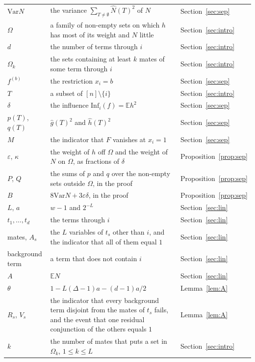 \documentclass[11pt]{amsart}
\theoremstyle{remark}
\newcommand{\Inf}{\mathrm{Inf}}
\newcommand{\Var}{\mathrm{Var}}
\newcommand{\E}{\mathbb{E}}
\begin{document}
\begin{longtable}{@{}>{\raggedright\arraybackslash}p{}>{\raggedright\arraybackslash}p{}>{\raggedright\arraybackslash}p{}@{}}
$\Var N$ & the variance $\sum_{T\ne\emptyset}\hat N(T)^2$ of $N$ & Section~\ref{sec:sep} \\
$\Omega$ & a family of non-empty sets on which $h$ has most of its weight and $N$ little & Section~\ref{sec:intro} \\
$d$ & the number of terms through $i$ & Section~\ref{sec:intro} \\
$\Omega_k$ & the sets containing at least $k$ mates of some term through $i$ & Section~\ref{sec:intro} \\
$f^{(b)}$ & the restriction $x_i=b$ & Section~\ref{sec:sep} \\
$T$ & a subset of $[n]\setminus\{i\}$ & Section~\ref{sec:intro} \\
$\delta$ & the influence $\Inf_i(f)=\E h^2$ & Section~\ref{sec:sep} \\
$p(T)$, $q(T)$ & $\hat g(T)^2$ and $\hat h(T)^2$ & Section~\ref{sec:sep} \\
$M$ & the indicator that $F$ vanishes at $x_i=1$ & Section~\ref{sec:sep} \\
$\varepsilon$, $\kappa$ & the weight of $h$ off $\Omega$ and the weight of $N$ on $\Omega$, as fractions of $\delta$ & Proposition~\ref{prop:sep} \\
$P$, $Q$ & the sums of $p$ and $q$ over the non-empty sets outside $\Omega$, in the proof & Proposition~\ref{prop:sep} \\
$B$ & $8\Var N+3\varepsilon\delta$, in the proof & Proposition~\ref{prop:sep} \\
$L$, $a$ & $w-1$ and $2^{-L}$ & Section~\ref{sec:lin} \\
$t_1,\dots,t_d$ & the terms through $i$ & Section~\ref{sec:lin} \\
mates, $A_s$ & the $L$ variables of $t_s$ other than $i$, and the indicator that all of them equal $1$ & Section~\ref{sec:lin} \\
background term & a term that does not contain $i$ & Section~\ref{sec:lin} \\
$A$ & $\E N$ & Section~\ref{sec:lin} \\
$\theta$ & $1-L(\Delta-1)a-(d-1)a/2$ & Lemma~\ref{lem:A} \\
$R_s$, $V_s$ & the indicator that every background term disjoint from the mates of $t_s$ fails, and the event that one residual conjunction of the others equals $1$ & Lemma~\ref{lem:A} \\
$k$ & the number of mates that puts a set in $\Omega_k$, $1\le k\le L$ & Section~\ref{sec:intro} \\

\end{longtable}
\end{document}
